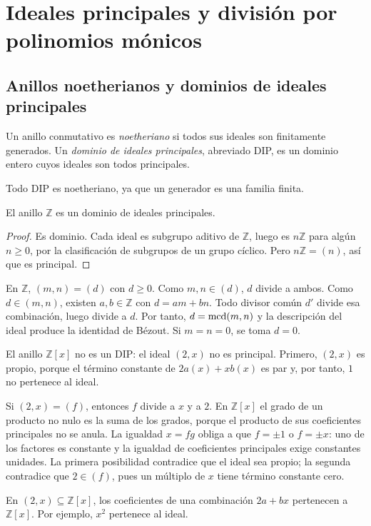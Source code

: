 \section{Ideales principales y división por polinomios mónicos}\label{sec:anillos-principales}

\subsection{Anillos noetherianos y dominios de ideales principales}\label{tema:12-3-2}
\begin{defi}
Un anillo conmutativo es \emph{noetheriano} si todos sus ideales son finitamente generados. Un \emph{dominio de ideales principales}, abreviado DIP, es un dominio entero cuyos ideales son todos principales.
\end{defi}
Todo DIP es noetheriano, ya que un generador es una familia finita.

\begin{prop}\label{prop:C12-ZDIP}
El anillo $\mathbb Z$ es un dominio de ideales principales.
\end{prop}
\begin{proof}
Es dominio. Cada ideal es subgrupo aditivo de $\mathbb Z$, luego es $n\mathbb Z$ para algún $n\geq0$, por la clasificación de subgrupos de un grupo cíclico. Pero $n\mathbb Z=(n)$, así que es principal.
\end{proof}

\begin{ejem}
En $\mathbb Z$, $(m,n)=(d)$ con $d\geq0$. Como $m,n\in(d)$, $d$ divide a ambos. Como $d\in(m,n)$, existen $a,b\in\mathbb Z$ con $d=am+bn$. Todo divisor común $d'$ divide esa combinación, luego divide a $d$. Por tanto, $d=\operatorname{mcd}(m,n)$ y la descripción del ideal produce la identidad de Bézout. Si $m=n=0$, se toma $d=0$.
\end{ejem}

\begin{ejem}\label{ejem:C12-noDIP}
El anillo $\mathbb Z[x]$ no es un DIP: el ideal $(2,x)$ no es principal. Primero, $(2,x)$ es propio, porque el término constante de $2a(x)+xb(x)$ es par y, por tanto, $1$ no pertenece al ideal.

Si $(2,x)=(f)$, entonces $f$ divide a $x$ y a $2$. En $\mathbb Z[x]$ el grado de un producto no nulo es la suma de los grados, porque el producto de sus coeficientes principales no se anula. La igualdad $x=fg$ obliga a que $f=\pm1$ o $f=\pm x$: uno de los factores es constante y la igualdad de coeficientes principales exige constantes unidades. La primera posibilidad contradice que el ideal sea propio; la segunda contradice que $2\in(f)$, pues un múltiplo de $x$ tiene término constante cero.
\end{ejem}
\begin{obs}
En $(2,x)\subseteq\mathbb Z[x]$, los coeficientes de una combinación $2a+bx$ pertenecen a $\mathbb Z[x]$. Por ejemplo, $x^2$ pertenece al ideal.
\end{obs}

